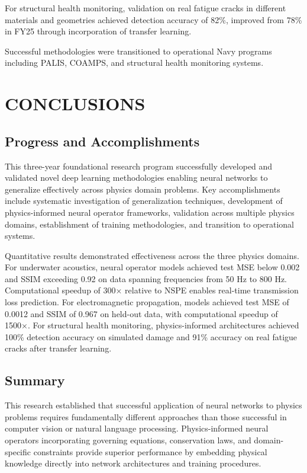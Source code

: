 \documentclass{article}
\begin{document}
For structural health monitoring, validation on real fatigue cracks in different materials and geometries achieved detection accuracy of 82\%, improved from 78\% in FY25 through incorporation of transfer learning.

Successful methodologies were transitioned to operational Navy programs including PALIS, COAMPS, and structural health monitoring systems.

\section{CONCLUSIONS}

\subsection{Progress and Accomplishments}

This three-year foundational research program successfully developed and validated novel deep learning methodologies enabling neural networks to generalize effectively across physics domain problems. Key accomplishments include systematic investigation of generalization techniques, development of physics-informed neural operator frameworks, validation across multiple physics domains, establishment of training methodologies, and transition to operational systems.

Quantitative results demonstrated effectiveness across the three physics domains. For underwater acoustics, neural operator models achieved test MSE below 0.002 and SSIM exceeding 0.92 on data spanning frequencies from 50 Hz to 800 Hz. Computational speedup of 300× relative to NSPE enables real-time transmission loss prediction. For electromagnetic propagation, models achieved test MSE of 0.0012 and SSIM of 0.967 on held-out data, with computational speedup of 1500×. For structural health monitoring, physics-informed architectures achieved 100\% detection accuracy on simulated damage and 91\% accuracy on real fatigue cracks after transfer learning.

\subsection{Summary}

This research established that successful application of neural networks to physics problems requires fundamentally different approaches than those successful in computer vision or natural language processing. Physics-informed neural operators incorporating governing equations, conservation laws, and domain-specific constraints provide superior performance by embedding physical knowledge directly into network architectures and training procedures.
\end{document}
